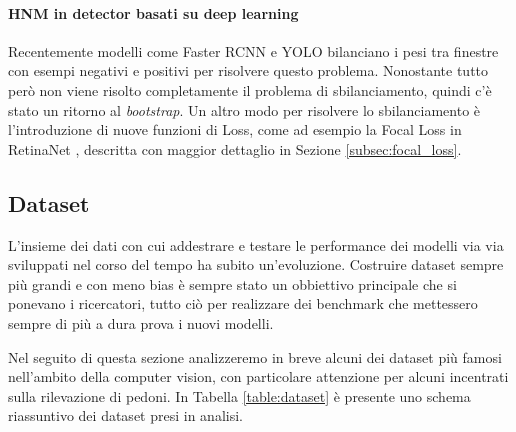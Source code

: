 \paragraph{HNM in detector basati su deep learning}
Recentemente modelli come Faster RCNN e \ac{YOLO} bilanciano i pesi tra finestre con esempi negativi e positivi per risolvere questo problema. Nonostante tutto però non viene risolto completamente il problema di sbilanciamento, quindi c'è stato un ritorno al \textit{bootstrap}. Un altro modo per risolvere lo sbilanciamento è l'introduzione di nuove funzioni di Loss, come ad esempio la Focal Loss in RetinaNet \cite{lin2017focal}, descritta con maggior dettaglio in Sezione \ref{subsec:focal_loss}. 




\subsection{Dataset}
L'insieme dei dati con cui addestrare e testare le performance dei modelli via via sviluppati nel corso del tempo ha subito un'evoluzione. Costruire dataset sempre più grandi e con meno bias è sempre stato un obbiettivo principale che si ponevano i ricercatori, tutto ciò per realizzare dei benchmark che mettessero sempre di più a dura prova i nuovi modelli. 

Nel seguito di questa sezione analizzeremo in breve alcuni dei dataset più famosi nell'ambito della computer vision, con particolare attenzione per alcuni incentrati sulla rilevazione di pedoni. In Tabella \ref{table:dataset} è presente uno schema riassuntivo dei dataset presi in analisi.


